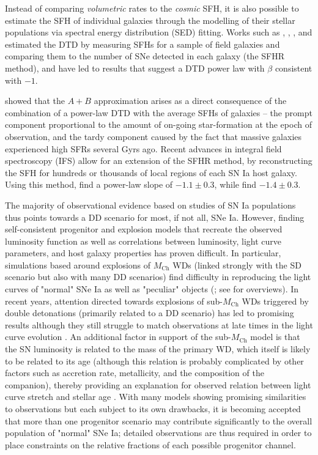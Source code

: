 \documentclass[fleqn,usenatbib]{mnras}
\begin{document}
Instead of comparing \textit{volumetric} rates to the \textit{cosmic} SFH, it is also possible to estimate the SFH of individual galaxies through the modelling of their stellar populations via spectral energy distribution (SED) fitting. Works such as \citet{Maoz2011}, \citet{Maoz2012}, \citet{Graur2013}, and \citet{Graur2015} estimated the DTD by measuring SFHs for a sample of field galaxies and comparing them to the number of SNe detected in each galaxy (the SFHR method), and have led to results that suggest a DTD power law with $\beta$ consistent with $-1$. 

\citet[][hereafter C14]{Childress2014} showed that the $A+B$ approximation arises as a direct consequence of the combination of a power-law DTD with the average SFHs of galaxies -- the prompt component proportional to the amount of on-going star-formation at the epoch of observation, and the tardy component caused by the fact that massive galaxies experienced high SFRs several Gyrs ago. Recent advances in integral field spectroscopy (IFS) allow for an extension of the SFHR method, by reconstructing the SFH for hundreds or thousands of local regions of each SN Ia host galaxy. Using this method, \citet{Castrillo2020} find a power-law slope of $-1.1\pm0.3$, while \citet{Chen2021} find $-1.4\pm0.3$.

The majority of observational evidence based on studies of SN Ia populations thus points towards a DD scenario for most, if not all, SNe Ia. However, finding self-consistent progenitor and explosion models that recreate the observed luminosity function as well as correlations between luminosity, light curve parameters, and host galaxy properties has proven difficult. In particular, simulations based around explosions of $M_{\mathrm{Ch}}$ WDs (linked strongly with the SD scenario but also with many DD scenarios) find difficulty in reproducing the light curves of "normal" SNe Ia as well as "peculiar" objects (\citealt{Ropke2007,Sim2013,Blondin2017}; see \citealt{Maoz2014,Jha2019} for overviews). In recent years, attention directed towards explosions of sub-$M_{\mathrm{Ch}}$ WDs triggered by double detonations (primarily related to a DD scenario) has led to promising results \citep[e.g.][]{Shen2017,Shen2018,Townsley2019,Gronow2020,Shen2021} although they still struggle to match observations at late times in the light curve evolution \citep{Shen2021,Gronow2021}. An additional factor in support of the sub-$M_{\mathrm{Ch}}$ model is that the SN luminosity is related to the mass of the primary WD, which itself is likely to be related to its age (although this relation is probably complicated by other factors such as accretion rate, metallicity, and the composition of the companion), thereby providing an explanation for observed relation between light curve stretch and stellar age \citep{Rigault2013,Rigault2018,Rose2019,Nicolas2020}. With many models showing promising similarities to observations but each subject to its own drawbacks, it is becoming accepted that more than one progenitor scenario may contribute significantly to the overall population of "normal" SNe Ia; detailed observations are thus required in order to place constraints on the relative fractions of each possible progenitor channel. 
\end{document}
